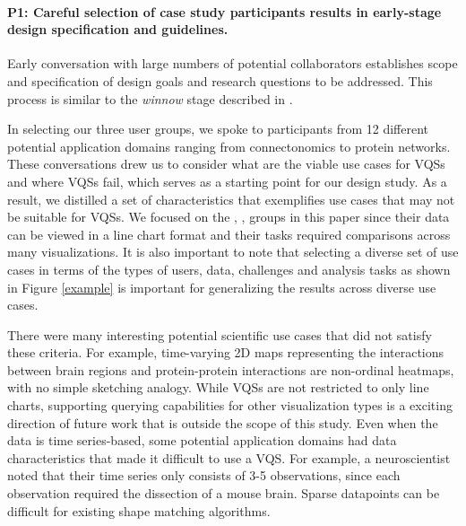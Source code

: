 {\paragraph{P1: Careful selection of case study participants results in early-stage design specification and guidelines.}
\par Early conversation with large numbers of potential collaborators establishes scope and specification of design goals and research questions to be addressed. This process is similar to the \textit{winnow} stage described in \cite{Sedlmair2012}. 
\par In selecting our three user groups, we spoke to participants from 12 different potential application domains ranging from connectonomics to protein networks. These conversations drew us to consider what are the viable use cases for VQSs and where VQSs fail, which serves as a starting point for our design study. As a result, we distilled a set of characteristics that exemplifies use cases that may not be suitable for VQSs. We focused on the \astro, \bio, \matsci groups in this paper since their data can be viewed in a line chart format and their tasks required comparisons across many visualizations. It is also important to note that selecting a diverse set of use cases in terms of the types of users, data, challenges and analysis tasks as shown in Figure \ref{example} is important for generalizing the results across diverse use cases.
\par There were many interesting potential scientific use cases that did not satisfy these criteria. For example, time-varying 2D maps representing the interactions between brain regions and protein-protein interactions are non-ordinal heatmaps, with no simple sketching analogy. While VQSs are not restricted to only line charts, supporting querying capabilities for other visualization types is a exciting direction of future work that is outside the scope of this study. Even when the data is time series-based, some potential application domains had data characteristics that made it difficult to use a VQS. For example, a neuroscientist noted that their time series only consists of 3-5  observations, since each observation required the dissection of a mouse brain. Sparse datapoints can be difficult for existing shape matching algorithms.  
}
